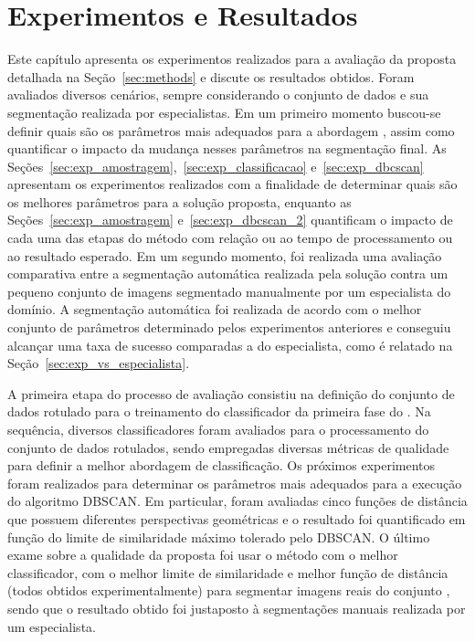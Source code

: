 \clearpage
\section{Experimentos e Resultados} \label{sec:exp_result}

Este capítulo apresenta os experimentos realizados para a avaliação da proposta \system detalhada na Seção~\ref{sec:methods} e discute os resultados obtidos.
Foram avaliados diversos cenários, sempre considerando o conjunto de dados \dataset e sua segmentação realizada por especialistas.
Em um primeiro momento buscou-se definir quais são os parâmetros mais adequados para a abordagem \system, assim como quantificar o impacto da mudança nesses parâmetros na segmentação final.
As Seções~\ref{sec:exp_amostragem},~\ref{sec:exp_classificacao} e~\ref{sec:exp_dbcscan} apresentam os experimentos realizados com a finalidade de determinar quais são os melhores parâmetros para a solução proposta, enquanto as Seções~\ref{sec:exp_amostragem} e~\ref{sec:exp_dbcscan_2} quantificam o impacto de cada uma das etapas do método com relação ou ao tempo de processamento ou ao resultado esperado.
Em um segundo momento, foi realizada uma avaliação comparativa entre a segmentação automática realizada pela solução \system contra um pequeno conjunto de imagens segmentado manualmente por um especialista do domínio.
A segmentação automática foi realizada de acordo com o melhor conjunto de parâmetros determinado pelos experimentos anteriores e conseguiu alcançar uma taxa de sucesso comparadas a do especialista, como é relatado na Seção~\ref{sec:exp_vs_especialista}.

A primeira etapa do processo de avaliação consistiu na definição do conjunto de dados rotulado para o treinamento do classificador da primeira fase do \system.
Na sequência, diversos classificadores foram avaliados para o processamento do conjunto de dados rotulados, sendo empregadas diversas métricas de qualidade para definir a melhor abordagem de classificação.
Os próximos experimentos foram realizados para determinar os parâmetros mais adequados para a execução do algoritmo DBSCAN.
Em particular, foram avaliadas cinco funções de distância que possuem diferentes perspectivas geométricas e o resultado foi quantificado em função do limite de similaridade máximo tolerado pelo DBSCAN.
O último exame sobre a qualidade da proposta foi usar o método \system com o melhor classificador, com o melhor limite de similaridade e melhor função de distância (todos obtidos experimentalmente) para segmentar imagens reais do conjunto \dataset, sendo que o resultado obtido foi justaposto à segmentações manuais realizada por um especialista.

